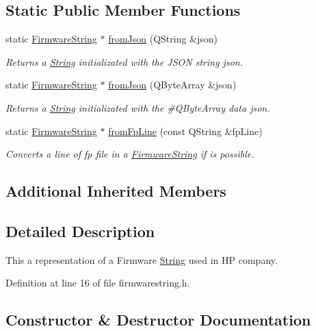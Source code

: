 \subsection*{Static Public Member Functions}
\begin{DoxyCompactItemize}
\item 
static \mbox{\hyperlink{classFirmwareString}{Firmware\+String}} $\ast$ \mbox{\hyperlink{classFirmwareString_a94293dec7077d625c6b977f1f15bfd2d}{from\+Json}} (Q\+String \&json)
\begin{DoxyCompactList}\small\item\em Returns a \mbox{\hyperlink{classString}{String}} initializated with the J\+S\+ON string json. \end{DoxyCompactList}\item 
static \mbox{\hyperlink{classFirmwareString}{Firmware\+String}} $\ast$ \mbox{\hyperlink{classFirmwareString_a90a6e343748d41c0a0ab9eb7e4fccaee}{from\+Json}} (Q\+Byte\+Array \&json)
\begin{DoxyCompactList}\small\item\em Returns a \mbox{\hyperlink{classString}{String}} initializated with the \#\+Q\+Byte\+Array data json. \end{DoxyCompactList}\item 
static \mbox{\hyperlink{classFirmwareString}{Firmware\+String}} $\ast$ \mbox{\hyperlink{classFirmwareString_a0fcfdf14bbecd7c2c4464574b9ce9d91}{from\+Fp\+Line}} (const Q\+String \&fp\+Line)
\begin{DoxyCompactList}\small\item\em Converts a line of fp file in a \mbox{\hyperlink{classFirmwareString}{Firmware\+String}} if is possible. \end{DoxyCompactList}\end{DoxyCompactItemize}
\subsection*{Additional Inherited Members}


\subsection{Detailed Description}
This a representation of a Firmware \mbox{\hyperlink{classString}{String}} used in HP company. 

Definition at line 16 of file firmwarestring.\+h.



\subsection{Constructor \& Destructor Documentation}
\mbox{\label{classFirmwareString_a624ab9d3c534ffd9c99665d2462e73ac}} 
